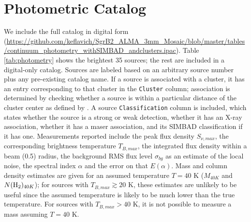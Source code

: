 \documentclass[twocolumn]{aastex61}
\begin{document}
\section{Photometric Catalog}
We include the full catalog in digital form
(\url{https://github.com/keflavich/SgrB2_ALMA_3mm_Mosaic/blob/master/tables/continuum_photometry_withSIMBAD_andclusters.ipac}).
Table \ref{tab:photometry} shows
the brightest 35 sources; the rest are included in a digital-only catalog.
Sources are labeled based on an arbitrary source
number plus any pre-existing catalog name.  If a source is associated with a cluster,
it has an entry corresponding to that cluster in the \texttt{Cluster} column;
association is determined by checking whether a source is within a particular distance
of the cluster center as defined by \citet{Schmiedeke2016a}.  A source
\texttt{Classification} column is included, which states whether the source
is a strong or weak detection, whether it has an X-ray association, whether it
has a maser association, and its SIMBAD classification if it has one.
Measurements reported include the peak flux density $S_{\nu,max}$, the
corresponding brightness temperature $T_{B,max}$, the integrated flux density
within a beam (0.5\arcsec) radius, the background RMS flux level $\sigma_{bg}$
as an estimate of the local noise, the spectral index $\alpha$ and the error on
that $E(\alpha)$.  Mass and column density estimates are given for an assumed
temperature $T=40$ K ($M_{40K}$ and $N(\textrm{H}_{2})_{40K}$); for sources with
$T_{B,max}\gtrsim20$ K, these estimates are unlikely to be useful since the
assumed temperature is likely to be much lower than the true temperature.
For sources with $T_{B,max}>40$ K, it is not possible to measure a mass
assuming $T=40$ K.


\end{document}
